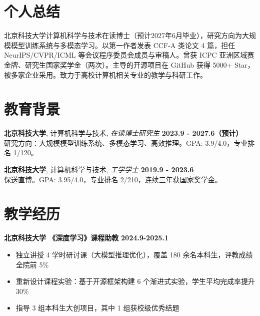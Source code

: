 \section{\makebox[\widthof{\faUser}][c]{\color{USTB_Blue}{\faUser}}\quad 个人总结}
\vspace{0.3em}
北京科技大学计算机科学与技术在读博士（预计2027年6月毕业），研究方向为大规模模型训练系统与多模态学习。以第一作者发表 CCF-A 类论文 4 篇，担任 NeurIPS/CVPR/ICML 等会议程序委员会成员与审稿人。曾获 ICPC 亚洲区域赛金牌、研究生国家奖学金（两次）。主导的开源项目在 GitHub 获得 5000+ Star，被多家企业采用。致力于高校计算机相关专业的教学与科研工作。

\section{\makebox[\widthof{\faGraduationCap}][c]{\color{USTB_Blue}{\faGraduationCap}}\quad 教育背景}
\vspace{0.3em}
{\large{\textbf{北京科技大学}}, 计算机科学与技术, \textit{在读博士研究生}} \hfill \textbf{2023.9 - 2027.6（预计）}\\
研究方向：大规模模型训练系统、多模态学习、高效推理。GPA: 3.9/4.0，专业排名 1/120。

\vspace{0.5em}
{\large{\textbf{北京科技大学}}, 计算机科学与技术, \textit{工学学士}} \hfill \textbf{2019.9 - 2023.6}\\
保送直博。GPA: 3.95/4.0，专业排名 2/210，连续三年获国家奖学金。

\section{\makebox[\widthof{\faChalkboardTeacher}][c]{\color{USTB_Blue}{\faChalkboardTeacher}}\quad 教学经历}
\vspace{0.3em}
{\large{\textbf{北京科技大学 《深度学习》课程助教}}} \hfill \textbf{2024.9-2025.1}
\begin{itemize}
    \item 独立讲授 4 学时研讨课（大模型推理优化），覆盖 180 余名本科生，评教成绩全院前 5\%
    \item 重新设计课程实验：基于开源框架构建 6 个渐进式实验，学生平均完成率提升 30\%
    \item 指导 3 组本科生大创项目，其中 1 组获校级优秀结题
\end{itemize}

